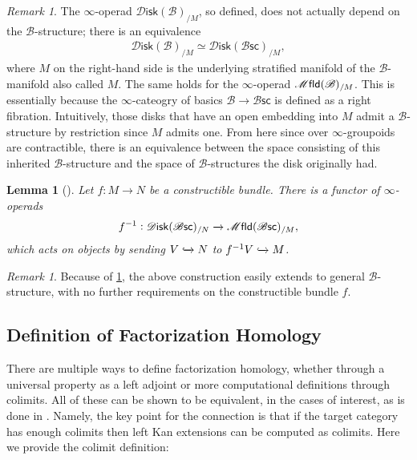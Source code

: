 \documentclass[12pt,a4paper]{article}
\newcounter{counter} \numberwithin{counter}{section}
\theoremstyle{definition}
\theoremstyle{plain}
\newtheorem{lemma}[counter]{Lemma}
\theoremstyle{remark}
\newtheorem{remark}[counter]{Remark}
\newcommand{\mfld}[1][s]{%
    \ifx r#1\mathsf{Mfld}\else
    \ifx s#1\mathscr{M} \mathsf{fld}\else
    \mathrm{Illegal~option}%
    \fi\fi
}
\newcommand{\disk}{\mathscr{D} \mathsf{isk}}
\newcommand{\bsc}{\mathscr{B} \mathsf{sc}}
\newcommand{\bstr}{\mathscr{B}}
\begin{document}
\begin{remark}\label{rem:disk_b=disk_bsc}
    The $\infty$-operad $\disk(\bstr)_{/M}$, so defined, does not actually depend on the $\bstr$-structure; there is an equivalence
    \begin{align}
        \disk(\bstr)_{/M} \simeq \disk(\bsc)_{/M},
    \end{align}
    where $M$ on the right-hand side is the underlying stratified manifold of the $\bstr$-manifold also called $M$. The same holds for the $\infty$-operad $\mfld(\bstr)_{/M}$. This is essentially because the $\infty$-cateogry of basics $\bstr \rightarrow \bsc$ is defined as a right fibration. Intuitively, those disks that have an open embedding into $M$ admit a $\bstr$-structure by restriction since $M$ admits one. From here since over $\infty$-groupoids are contractible, there is an equivalence between the space consisting of this inherited $\bstr$-structure and the space of $\bstr$-structures the disk originally had. 
\end{remark}

\begin{lemma}[{\cite[lem.2.24]{aft_fhstrat}}]\label{lem:f^-1}
    Let $f: M \rightarrow N$ be a constructible bundle. There is a functor of $\infty$-operads
    \begin{align}
        f^{-1}: \disk(\bsc)_{/N} \xrightarrow{} \mfld(\bsc)_{/M},
    \end{align}
    which acts on objects by sending $V \xhookrightarrow{} N$ to $f^{-1}V \xhookrightarrow{} M$.
\end{lemma}

\begin{remark}
    Because of \cref{rem:disk_b=disk_bsc}, the above construction easily extends to general $\bstr$-structure, with no further requirements on the constructible bundle $f$.
\end{remark}

\subsection{Definition of Factorization Homology}

There are multiple ways to define factorization homology, whether through a universal property as a left adjoint or more computational definitions through colimits. All of these can be shown to be equivalent, in the cases of interest, as is done in \cite{af_fhtop,aft_fhstrat,af_primer}. Namely, the key point for the connection is that if the target category has enough colimits then left Kan extensions can be computed as colimits. Here we provide the colimit definition:
\end{document}
